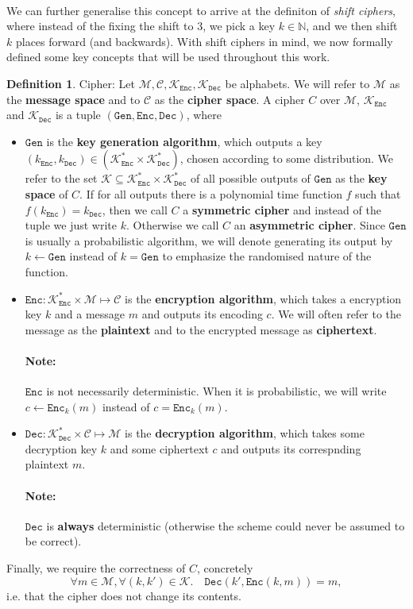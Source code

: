 \documentclass{article}
\theoremstyle{definition}
\newtheorem{definition}{Definition}[section]
\newcommand{\Enc}{\texttt{Enc}}
\newcommand{\Dec}{\texttt{Dec}}
\newcommand{\Gen}{\texttt{Gen}}
\renewcommand{\C}{\mathcal{C}}
\newcommand{\M}{\mathcal{M}}
\newcommand{\C}{\mathcal{C}}
\newcommand{\K}{\mathcal{K}}
\begin{document}
\paragraph{}
We can further generalise this concept to arrive at the definiton of
\textit{shift ciphers}, where instead of the fixing the shift to 3, we pick a
key $k \in \mathbb{N}$, and we then shift $k$ places forward (and backwards).
With shift ciphers in mind, we now formally defined some key concepts that will
be used throughout this work.
\begin{definition}{Cipher:}
  Let $\M, \C, \K_\Enc, \K_\Dec$ be alphabets. We will refer to $\M$
  as the \textbf{message space} and to $\C$ as the \textbf{cipher space}.
  A cipher $C$ over $\M$, $\K_\Enc$ and $\K_\Dec$ is a tuple $(\Gen, \Enc, \Dec)$, where
  \begin{itemize}
  \item $\Gen$ is the \textbf{key generation algorithm}, which outputs a key
    $(k_\Enc, k_\Dec) \in (\K_\Enc^* \times \K_\Dec^*)$, chosen according to some
    distribution. We refer to the set $\K\subseteq \K_\Enc^* \times \K_\Dec^*$ of all possible outputs of $\Gen$ as the
    \textbf{key space} of $C$. If for all outputs there is a polynomial time
    function $f$ such that $f(k_\Enc) = k_\Dec$, then we call $C$
    a \textbf{symmetric cipher} and instead of the tuple we just write $k$.
    Otherwise we call $C$ an \textbf{asymmetric cipher}.
    Since $\Gen$ is usually a probabilistic algorithm, we will denote generating
    its output by $k \leftarrow \Gen$ instead of $k = \Gen$ to emphasize the
    randomised nature of the function.
  \item $\Enc: \K_\Enc^*\times\M\mapsto \C$ is the \textbf{encryption algorithm}, which takes
    a encryption key $k$ and a message $m$ and outputs its encoding $c$. We will often
    refer to the message as the \textbf{plaintext} and to the encrypted message
    as \textbf{ciphertext}.
    \paragraph{Note:} $\Enc$ is not necessarily deterministic. When it is
    probabilistic, we will write $c \leftarrow \Enc_k(m)$ instead of $c = \Enc_k(m)$.
  \item $\Dec: \K_\Dec^*\times\C \mapsto \M$ is the \textbf{decryption algorithm}, which
    takes some decryption key $k$ and some ciphertext $c$ and outputs its
    correspnding plaintext $m$. 
    \paragraph{Note:} $\Dec$ is \textbf{always} deterministic (otherwise the
    scheme could never be assumed to be correct).
  \end{itemize}
  Finally, we require the correctness of $C$, concretely
  \[
    \forall m \in \M, \forall (k, k') \in \K. \quad \Dec(k', \Enc(k, m)) = m,
  \]
  i.e. that the cipher does not change its contents.
\end{definition}
\end{document}
